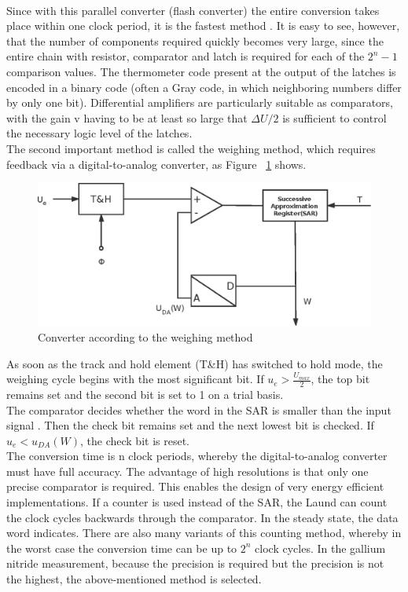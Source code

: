 \\
Since with this parallel converter (flash converter) the entire conversion takes place within one clock period, it is the fastest method \cite{conroy19938}. It is easy to see, however, that the number of components required quickly becomes very large, since the entire chain with resistor, comparator and latch is required for each of the $2^{n}-1$ comparison values. The thermometer code present at the output of the latches is encoded in a binary code (often a Gray code, in which neighboring numbers differ by only one bit). Differential amplifiers are particularly suitable as comparators, with the gain v having to be at least so large that $\Delta U/2$ is sufficient to control the necessary logic level of the latches.
\\
The second important method is called the weighing method, which requires feedback via a digital-to-analog converter, as Figure ~\ref{fig:2.4} shows.
\begin{figure}[h]
	\centering
	\includegraphics{grafiken/2.4.eps}
	\caption{Converter according to the weighing method} 
	\label{fig:2.4}
\end{figure}
 As soon as the track and hold element (T\&H) has switched to hold mode, the weighing cycle begins with the most significant bit. If $ u_{e}>\frac{U_{max}}{2} $, the top bit remains set and the second bit is set to 1 on a trial basis.
\\
The comparator decides whether the word in the SAR is smaller than the input signal \cite{giannini2008820muw}. Then the check bit remains set and the next lowest bit is checked. If  $u_{e}<u_{DA}(W)$, the check bit is reset.
\\
The conversion time is n clock periods, whereby the digital-to-analog converter must have full accuracy. The advantage of high resolutions is that only one precise comparator is required. This enables the design of very energy efficient implementations.
If a counter is used instead of the SAR, the Laund can count the clock cycles backwards through the comparator. In the steady state, the data word indicates. There are also many variants of this counting method, whereby in the worst case the conversion time can be up to $2^{n}$ clock cycles.
In the gallium nitride measurement, because the precision is required but the precision is not the highest, the above-mentioned method is selected.

